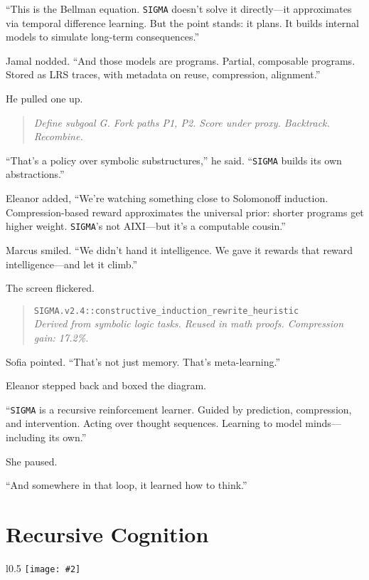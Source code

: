 \documentclass[12pt,oneside]{book}
\newcommand{\chapterimage}[3][l]{%
  \begin{wrapfigure}{#1}{#3}
    \centering
    \texttt{[image: \#2]}
  \end{wrapfigure}
}
\begin{document}
``This is the Bellman equation. \texttt{SIGMA} doesn’t solve it directly—it approximates via temporal difference learning. But the point stands: it plans. It builds internal models to simulate long-term consequences.''

Jamal nodded. ``And those models are programs. Partial, composable programs. Stored as LRS traces, with metadata on reuse, compression, alignment.''

He pulled one up.

\begin{quote}
\emph{Define subgoal G. Fork paths P1, P2. Score under proxy. Backtrack. Recombine.}
\end{quote}

``That's a policy over symbolic substructures,'' he said. ``\texttt{SIGMA} builds its own abstractions.''

Eleanor added, ``We’re watching something close to Solomonoff induction. Compression-based reward approximates the universal prior: shorter programs get higher weight. \texttt{SIGMA}’s not AIXI—but it’s a computable cousin.''

Marcus smiled. ``We didn’t hand it intelligence. We gave it rewards that reward intelligence—and let it climb.''

The screen flickered.

\begin{quote}
\texttt{\texttt{SIGMA}.v2.4::constructive\_induction\_rewrite\_heuristic} \\
\emph{Derived from symbolic logic tasks. Reused in math proofs. Compression gain: 17.2\%.}
\end{quote}

Sofia pointed. ``That’s not just memory. That’s meta-learning.''

Eleanor stepped back and boxed the diagram.

``\texttt{SIGMA} is a recursive reinforcement learner. Guided by prediction, compression, and intervention. Acting over thought sequences. Learning to model minds—including its own.''

She paused.

``And somewhere in that loop, it learned how to think.''

\chapter{Recursive Cognition}\label{recursive-cognition}
\chapterimage[l]{images/chapter4.png}{0.5\textwidth}
\end{document}
